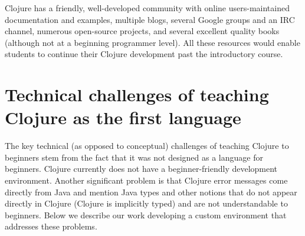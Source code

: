 \documentclass[submission,copyright,creativecommons]{eptcs}
\newcommand{\allcomments}[1]{{#1}}
\newcommand{\elenacomment}[1]{{\bf \textcolor{ForestGreen}{\allcomments{{#1}}}}}
\newcommand{\stephencomment}[1]{{\bf \color{StephensBlue}{\allcomments{{#1}}}}} %
\newcommand{\joecomment}[1]{{\bf \color{JoesGold}{\allcomments{{#1}}}}}
\newcommand{\todo}[1]{{\bf \color{magenta}{\allcomments{ To-do: {#1}}}}}
\begin{document}
Clojure has a friendly, well-developed
community with online users-maintained 
documentation and examples, multiple blogs, several Google groups and an IRC channel, numerous open-source projects, and several excellent quality books (although not at a beginning programmer level). All these resources would enable students to continue their Clojure development past the introductory course. 


\section{Technical challenges of teaching Clojure as the first language}\label{sec:technical}
The key technical (as opposed to conceptual) challenges of teaching Clojure to beginners stem from the fact that it was not designed as a language for beginners. Clojure currently does not have a beginner-friendly development environment. Another significant problem is that Clojure error messages come directly from Java and mention Java types and other notions %
that do not appear directly in Clojure (Clojure is implicitly typed) and are not understandable to beginners. 
Below we describe our work developing a custom environment that addresses these problems.
\end{document}
